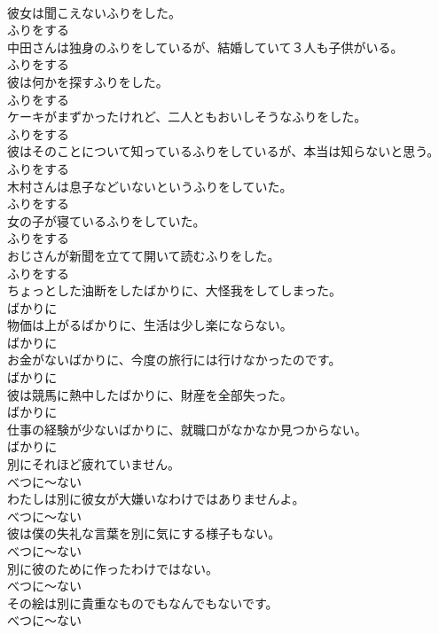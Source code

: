 \documentclass[8pt]{extreport}
\begin{document}
\begin{CJK}{UTF8}{min}
\\	彼女は聞こえないふりをした。	
\\	ふりをする
\\	中田さんは独身のふりをしているが、結婚していて３人も子供がいる。	
\\	ふりをする
\\	彼は何かを探すふりをした。	
\\	ふりをする
\\	ケーキがまずかったけれど、二人ともおいしそうなふりをした。	
\\	ふりをする
\\	彼はそのことについて知っているふりをしているが、本当は知らないと思う。	
\\	ふりをする
\\	木村さんは息子などいないというふりをしていた。	
\\	ふりをする
\\	女の子が寝ているふりをしていた。	
\\	ふりをする
\\	おじさんが新聞を立てて開いて読むふりをした。	
\\	ふりをする
\\	ちょっとした油断をしたばかりに、大怪我をしてしまった。	
\\	ばかりに
\\	物価は上がるばかりに、生活は少し楽にならない。	
\\	ばかりに
\\	お金がないばかりに、今度の旅行には行けなかったのです。	
\\	ばかりに
\\	彼は競馬に熱中したばかりに、財産を全部失った。	
\\	ばかりに
\\	仕事の経験が少ないばかりに、就職口がなかなか見つからない。	
\\	ばかりに
\\	別にそれほど疲れていません。	
\\	べつに～ない
\\	わたしは別に彼女が大嫌いなわけではありませんよ。	
\\	べつに～ない
\\	彼は僕の失礼な言葉を別に気にする様子もない。	
\\	べつに～ない
\\	別に彼のために作ったわけではない。	
\\	べつに～ない
\\	その絵は別に貴重なものでもなんでもないです。	
\\	べつに～ない

\end{CJK}
\end{document}
